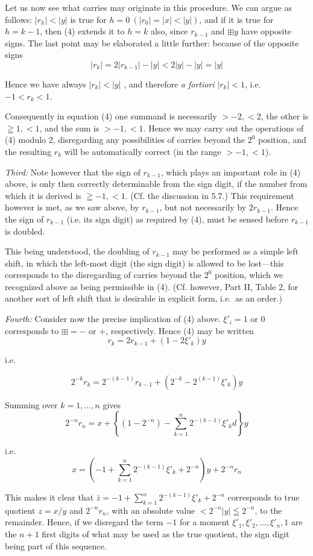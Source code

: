 \documentclass[12pt]{amsart}
\begin{document}
Let us now see what carries may originate in this procedure. We can argue as follows: $|r_h| < |y|$ is true for $h = 0\ (| r_0| = |x| <  |y|)$, and if it is true for $h = k - 1$, then (4) extends it to $h = k$ also, since $r_{k-1}$ and $\boxplus y$ have opposite signs. The last point may be elaborated a little further: because of the opposite signs
\[
|r_k| = 2|r_{k-1}| - |y| < 2|y| - |y| = |y|
\]

Hence we have always $|r_k| < |y|$ , and therefore \emph{a fortiori} $|r_k| < 1$, i.e.\ $-1 < r_k < 1$.

Consequently in equation (4) one summand is necessarily $> -2, <2$, the other is $\geqq 1, < 1$, and the sum is $>-1, < 1$. Hence we may carry out the operations of (4) modulo 2, disregarding any possibilities of carries beyond the $2^0$ position, and the resulting $r_k$ will be automatically correct (in the range $> -1, < 1$).

\emph{Third:} Note however that the sign of $r_{k-1}$, which plays an important role in (4) above, is only then correctly determinable from the sign digit, if the number from which it is derived is $\geqq -1, < 1$. (Cf. the discussion in 5.7.) This requirement however is met, as we saw above, by $r_{k-1}$, but not necessarily by $2r_{k-1}$. Hence the sign of $r_{k-1}$ (i.e. its sign digit) as required by (4), must be sensed before $r_{k-1}$ is doubled.

This being understood, the doubling of $r_{k-1}$ may be performed as a simple left shift, in which the left-most digit (the sign digit) is allowed to be lost---this corresponds to the disregarding of carries beyond the $2^0$ position, which we recognized above as being permissible in (4). (Cf. however, Part II, Table 2, for another sort of left shift that is desirable in explicit form, i.e.\ as an order.)

\emph{Fourth:} Consider now the precise implication of (4) above. $\xi'_i = 1$ or 0 corresponds to $\boxplus = -$ or $+$, respectively. Hence (4) may be written
\[
r_k = 2r_{k-1} + (1 - 2\xi'_k)y
\]

i.e.

\[
2^{-k}r_k = 2^{-(k - 1)}r_{k - 1} + (2^{-k} - 2^{(k - 1)}\xi'_k)y
\]

Summing over $k = 1, \dots, n$ gives
\[
2^{-n}r_n = x + \left \{ (1 - 2^{-n}) - \sum_{k=1}^n 2^{-(k-1)}\xi'_k d\right \} y
\]

i.e.
\[
x = \left(-1 + \sum_{k=1}^n 2^{-(k-1)}\xi'_k + 2^{-n}\right)y + 2^{-n}r_n
\]

This makes it clear that $\bar{z} = -1 + \sum_{k=1}^n 2^{-(k-1)}\xi'_k + 2^{-n}$ corresponds to true quotient $z = x/y$ and $2^{-n}r_n$, with an absolute value $< 2^{-n} |y| \leqq 2^{-n}$, to the remainder. Hence, if we disregard the term $-1$ for a moment $\xi'_1, \xi'_2, \dots, \xi'_n, 1$ are the $n + 1$ first digits of what may be used as the true quotient, the sign digit being part of this sequence.
\end{document}
